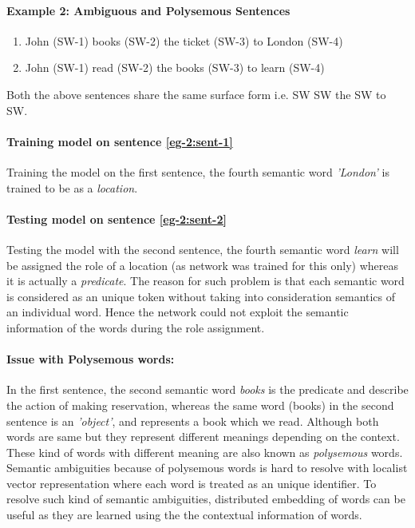 \paragraph{Example 2: Ambiguous and Polysemous Sentences}

\begin{enumerate}[noitemsep]
\item John (SW-1) books (SW-2) the ticket (SW-3) to London (SW-4) \label{eg-2:sent-1}
\item John (SW-1) read (SW-2) the books (SW-3) to learn (SW-4) \label{eg-2:sent-2}
\end{enumerate}

Both the above sentences share the same surface form i.e. SW SW the SW to SW.

\paragraph{Training model on sentence \ref{eg-2:sent-1}} Training the model on the first sentence, the fourth semantic word \textit{'London'} is trained to be as a \textit{location}.

\paragraph{Testing model on sentence \ref{eg-2:sent-2}} Testing the model with the second sentence, the fourth semantic word \textit{learn} will be assigned the role of a location (as network was trained for this only) whereas it is actually a \textit{predicate}. The reason for such problem is that each semantic word is considered as an unique token without taking into consideration semantics of an individual word. Hence the network could not exploit the semantic information of the words during the role assignment.

\paragraph{Issue with Polysemous words:} In the first sentence, the second semantic word \textit{books} is the predicate and describe the action of making reservation, whereas the same word (books) in the second sentence is an \textit{'object'}, and represents a book which we read. Although both words are same but they represent different meanings depending on the context. These kind of words with different meaning are also known as \textit{polysemous} words. Semantic ambiguities because of polysemous words is hard to resolve with localist vector representation where each word is treated as an unique identifier. To resolve such kind of semantic ambiguities, distributed embedding of words can be useful as they are learned using the the contextual information of words.

